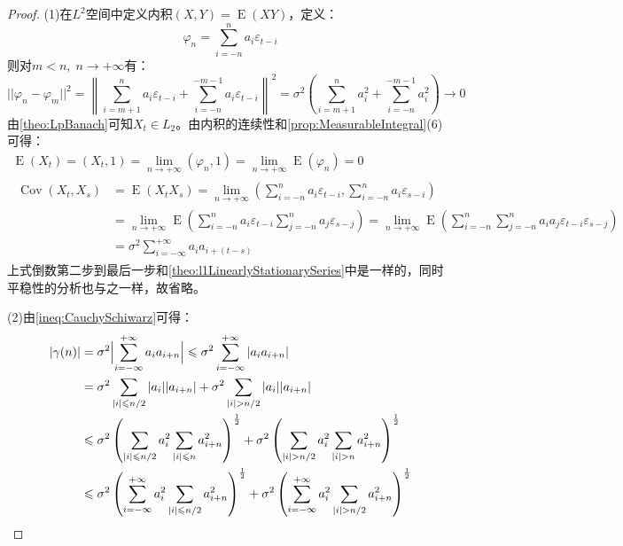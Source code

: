 \begin{proof}
	(1)在$L^2$空间中定义内积$(X,Y)=\operatorname{E}(XY)$，定义：
	\begin{equation*}
		\varphi_n=\sum_{i=-n}^{n}a_i\varepsilon_{t-i}
	\end{equation*}
	则对$m<n,\;n\to+\infty$有：
	\begin{equation*}
		||\varphi_n-\varphi_m||^2=\left\|\sum_{i=m+1}^{n}a_i\varepsilon_{t-i}+\sum_{i=-n}^{-m-1}a_i\varepsilon_{t-i}\right\|^2=\sigma^2\left(\sum_{i=m+1}^{n}a_i^2+\sum_{i=-n}^{-m-1}a_i^2\right)\to0
	\end{equation*}
	由\cref{theo:LpBanach}可知$X_t\in L_2$。由内积的连续性和\cref{prop:MeasurableIntegral}(6)可得：
	\begin{gather*}
		\operatorname{E}(X_t)=(X_t,1)=\lim_{n\to+\infty}(\varphi_n,1)=\lim_{n\to+\infty}\operatorname{E}(\varphi_n)=0 \\
		\begin{aligned}
			\operatorname{Cov}(X_t,X_s)&=\operatorname{E}(X_tX_s)=\lim_{n\to+\infty}\left(\sum_{i=-n}^{n}a_i\varepsilon_{t-i},\sum_{i=-n}^{n}a_i\varepsilon_{s-i}\right) \\
			&=\lim_{n\to+\infty}\operatorname{E}\left(\sum_{i=-n}^{n}a_i\varepsilon_{t-i}\sum_{j=-n}^{n}a_j\varepsilon_{s-j}\right)=\lim_{n\to+\infty}\operatorname{E}\left(\sum_{i=-n}^{n}\sum_{j=-n}^{n}a_ia_j\varepsilon_{t-i}\varepsilon_{s-j}\right) \\
			&=\sigma^2\sum_{i=-\infty}^{+\infty}a_ia_{i+(t-s)}
		\end{aligned}
	\end{gather*}
	上式倒数第二步到最后一步和\cref{theo:l1LinearlyStationarySeries}中是一样的，同时平稳性的分析也与之一样，故省略。\par
	(2)由\cref{ineq:CauchySchiwarz}可得：
	\begin{align*}
		|\gamma(n)|
		&=\sigma^2\Bigl|\sum_{i=-\infty}^{+\infty}a_ia_{i+n}\Bigr| \leqslant\sigma^2\sum_{i=-\infty}^{+\infty}|a_ia_{i+n}| \\
		&=\sigma^2\sum_{|i|\leqslant n/2}|a_i||a_{i+n}|+\sigma^2\sum_{|i|> n/2}|a_i||a_{i+n}| \\
		&\leqslant\sigma^2\left(\sum_{|i|\leqslant n/2}a_i^2\sum_{|i|\leqslant n}a_{i+n}^2\right)^\frac{1}{2}+\sigma^2\left(\sum_{|i|>n/2}a_i^2\sum_{|i|>n}a_{i+n}^2\right)^\frac{1}{2} \\
		&\leqslant\sigma^2\left(\sum_{i=-\infty}^{+\infty}a_i^2\sum_{|i|\leqslant n/2}a_{i+n}^2\right)^\frac{1}{2}+\sigma^2\left(\sum_{i=-\infty}^{+\infty}a_i^2\sum_{|i|>n/2}a_{i+n}^2\right)^\frac{1}{2}

\end{align*}
\end{proof}
